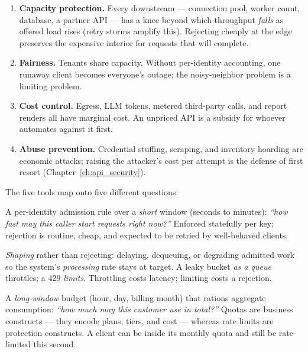 \begin{enumerate}
  \item \textbf{Capacity protection.} Every downstream --- connection pool,
        worker count, database, a partner API --- has a knee beyond which
        throughput \emph{falls} as offered load rises (retry storms
        amplify this). Rejecting cheaply at the edge preserves the
        expensive interior for requests that will complete.
  \item \textbf{Fairness.} Tenants share capacity. Without per-identity
        accounting, one runaway client becomes everyone's outage; the
        noisy-neighbor problem is a limiting problem.
  \item \textbf{Cost control.} Egress, LLM tokens, metered third-party
        calls, and report renders all have marginal cost. An unpriced API
        is a subsidy for whoever automates against it first.
  \item \textbf{Abuse prevention.} Credential stuffing, scraping, and
        inventory hoarding are economic attacks; raising the attacker's
        cost per attempt is the defense of first resort
        (Chapter~\ref{ch:api_security}).
\end{enumerate}

The five tools map onto five different questions:

\begin{definition}
A per-identity admission rule over a \emph{short} window (seconds to
minutes): \emph{``how fast may this caller start requests right now?''}
Enforced statefully per key; rejection is routine, cheap, and expected to be
retried by well-behaved clients.
\end{definition}

\begin{definition}[Throttling]
\emph{Shaping} rather than rejecting: delaying, dequeuing, or degrading
admitted work so the system's \emph{processing} rate stays at target. A
leaky bucket \emph{as a queue} throttles; a 429 \emph{limits}. Throttling
costs latency; limiting costs a rejection.
\end{definition}

\begin{definition}[Quota]
A \emph{long-window} budget (hour, day, billing month) that rations
aggregate consumption: \emph{``how much may this customer use in total?''}
Quotas are business constructs --- they encode plans, tiers, and cost ---
whereas rate limits are protection constructs. A client can be inside its
monthly quota and still be rate-limited this second.
\end{definition}

